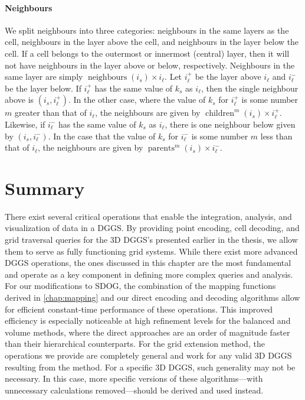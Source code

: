 \paragraph{Neighbours}
We split neighbours into three categories: neighbours in the same layers as the cell, neighbours in the layer above the cell, and neighbours in the layer below the cell.
If a cell belongs to the outermost or innermost (central) layer, then it will not have neighbours in the layer above or below, respectively.
Neighbours in the same layer are simply $\operatorname{neighbours}(i_s) \times i_\ell$.
Let $i_\ell^+$ be the layer above $i_\ell$ and $i_\ell^-$ be the layer below.
If $i_\ell^+$ has the same value of $k_s$ as $i_\ell$, then the single neighbour above is $(i_s, i_\ell^+)$.
In the other case, where the value of $k_s$ for $i_\ell^+$ is some number $m$ greater than that of $i_\ell$, the neighbours are given by $\operatorname{children}^m(i_s) \times i_\ell^+$.
Likewise, if $i_\ell^-$ has the same value of $k_s$ as $i_\ell$, there is one neighbour below given by $(i_s, i_\ell^-)$.
In the case that the value of $k_s$ for $i_\ell^-$ is some number $m$ less than that of $i_\ell$, the neighbours are given by $\operatorname{parents}^m(i_s) \times i_\ell^-$.


\section{Summary}
There exist several critical operations that enable the integration, analysis, and visualization of data in a DGGS.
By providing point encoding, cell decoding, and grid traversal queries for the 3D DGGS's presented earlier in the thesis, we allow them to serve as fully functioning grid systems.
While there exist more advanced DGGS operations, the ones discussed in this chapter are the most fundamental and operate as a key component in defining more complex queries and analysis.
For our modifications to SDOG, the combination of the mapping functions derived in \cref{chap:mapping} and our direct encoding and decoding algorithms allow for efficient constant-time performance of these operations.
This improved efficiency is especially noticeable at high refinement levels for the balanced and volume methods, where the direct approaches are an order of magnitude faster than their hierarchical counterparts.
For the grid extension method, the operations we provide are completely general and work for any valid 3D DGGS resulting from the method.
For a specific 3D DGGS, such generality may not be necessary.
In this case, more specific versions of these algorithms---with unnecessary calculations removed---should be derived and used instead.
